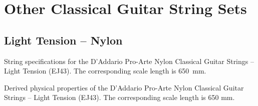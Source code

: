 %
%
%

 \newpage
 \section{Other Classical Guitar String Sets\label{app:specs}}

 \subsection{Light Tension -- Nylon\label{app:specs_ltn}}


 \begin{table}[htbp]
  \centering
  \caption{\label{tbl:ej43_mks} String specifications for the D'Addario Pro-Arte Nylon Classical Guitar Strings -- Light Tension (EJ43). The corresponding scale length is 650~mm.}
  
 \end{table}%

 \begin{table}[htbp]
  \centering
  \caption{\label{tbl:ej43_props} Derived physical properties of the D'Addario Pro-Arte Nylon Classical Guitar Strings -- Light Tension (EJ43). The corresponding scale length is 650 mm.}
  
 \end{table}%

